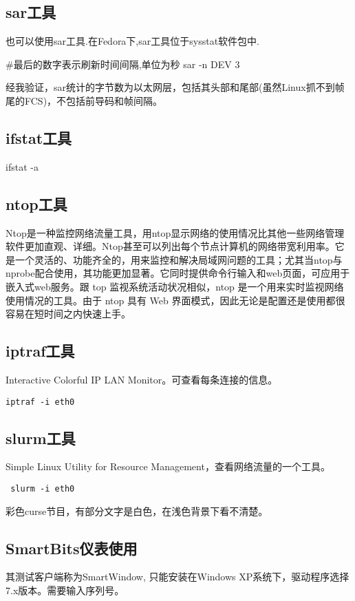 \subsection{sar工具}
也可以使用sar工具.在Fedora下,sar工具位于sysstat软件包中.
\begin{shellcmd}
#最后的数字表示刷新时间间隔,单位为秒
sar -n DEV 3 
\end{shellcmd}

经我验证，sar统计的字节数为以太网层，包括其头部和尾部(虽然Linux抓不到帧尾的FCS)，不包括前导码和帧间隔。

\subsection{ifstat工具}
\begin{shellcmd}
ifstat -a
\end{shellcmd}

\subsection{ntop工具}
Ntop是一种监控网络流量工具，用ntop显示网络的使用情况比其他一些网络管理软件更加直观、详细。Ntop甚至可以列出每个节点计算机的网络带宽利用率。它是一个灵活的、功能齐全的，用来监控和解决局域网问题的工具；尤其当ntop与nprobe配合使用，其功能更加显著。它同时提供命令行输入和web页面，可应用于嵌入式web服务。跟 top 监视系统活动状况相似，ntop 是一个用来实时监视网络使用情况的工具。由于 ntop 具有 Web 界面模式，因此无论是配置还是使用都很容易在短时间之内快速上手。

\subsection{iptraf工具}
Interactive Colorful IP LAN Monitor。可查看每条连接的信息。
\begin{verbatim}
iptraf -i eth0
\end{verbatim}


\subsection{slurm工具}
 Simple Linux Utility for Resource Management，查看网络流量的一个工具。
 \begin{verbatim}
 slurm -i eth0
 \end{verbatim}

彩色curse节目，有部分文字是白色，在浅色背景下看不清楚。




\subsection{SmartBits仪表使用}
其测试客户端称为SmartWindow, 只能安装在Windows XP系统下，驱动程序选择7.x版本。需要输入序列号。

